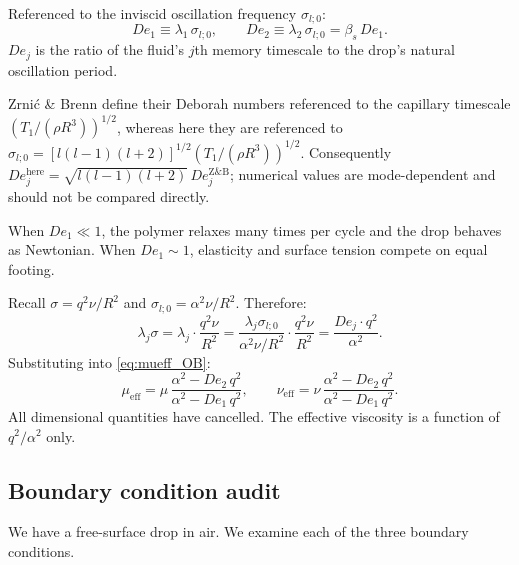 Referenced to the inviscid oscillation frequency $\sigma_{l;0}$:
\begin{equation}
  De_1 \equiv \lambda_1\,\sigma_{l;0},
  \qquad
  De_2 \equiv \lambda_2\,\sigma_{l;0} = \beta_s\,De_1.
  \label{eq:De_defs}
\end{equation}
$De_j$ is the ratio of the fluid's $j$th memory timescale to the drop's
natural oscillation period.

\begin{notebox}
Zrni\'{c} \& Brenn \cite{zirnic2024} define their Deborah numbers referenced
to the capillary timescale $(T_1/(\rho R^3))^{1/2}$, whereas here they are
referenced to $\sigma_{l;0} = [l(l-1)(l+2)]^{1/2}(T_1/(\rho R^3))^{1/2}$.
Consequently $De_j^{\text{here}} = \sqrt{l(l-1)(l+2)}\,De_j^{\text{Z\&B}}$;
numerical values are mode-dependent and should not be compared directly.
\end{notebox} When $De_1 \ll 1$, the polymer relaxes many times
per cycle and the drop behaves as Newtonian. When $De_1 \sim 1$, elasticity
and surface tension compete on equal footing.

\begin{derivbox}
Recall $\sigma = q^2\nu/R^2$ and $\sigma_{l;0} = \alpha^2\nu/R^2$.
Therefore:
\begin{equation}
  \lambda_j\sigma
  = \lambda_j\cdot\frac{q^2\nu}{R^2}
  = \frac{\lambda_j\sigma_{l;0}}{\alpha^2\nu/R^2}\cdot\frac{q^2\nu}{R^2}
  = \frac{De_j\cdot q^2}{\alpha^2}.
  \label{eq:lamsig}
\end{equation}
Substituting into \eqref{eq:mueff_OB}:
\begin{equation}
  \mu_{\mathrm{eff}} = \mu\,\frac{\alpha^2 - De_2\,q^2}{\alpha^2 - De_1\,q^2},
  \qquad
  \nu_{\mathrm{eff}} = \nu\,\frac{\alpha^2 - De_2\,q^2}{\alpha^2 - De_1\,q^2}.
  \label{eq:nueff_dimless}
\end{equation}
All dimensional quantities have cancelled. The effective viscosity is a
function of $q^2/\alpha^2$ only.
\end{derivbox}

\subsection{Boundary condition audit}

We have a free-surface drop in air. We examine each of the three boundary
conditions.

